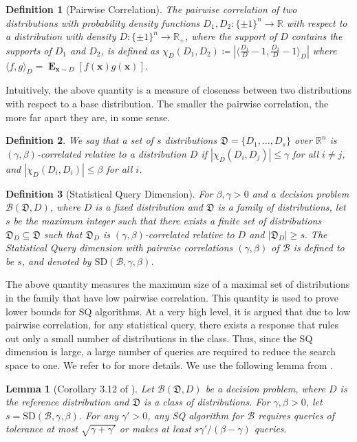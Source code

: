 \documentclass[10pt,a4paper]{article}
\newtheorem{lemma}{Lemma}[section]
\newtheorem{definition}{Definition}[section]
\newcommand{\eqdef}{\coloneqq}
\renewcommand\vec[1]{\mathbf{#1}}
\DeclareMathOperator*{\E}{\mathbf{E}}
\newcommand{\R}{\mathbb{R}}
\newcommand{\D}{D}
\newcommand{\1}{\Ind}
\newcommand{\x}{\vec x}
\begin{document}
\begin{definition}[Pairwise Correlation] \label{def:pc}
    The pairwise correlation of two distributions with probability density functions
    $\D_1, \D_2 : \{\pm 1\}^{n} \to \R$ with respect to a distribution with
    density $\D: \{\pm 1\}^n \to \R_+$, where the support of $\D$ contains
    the supports of $\D_1$ and $\D_2$, is defined as
    $\chi_{\D}(\D_1, \D_2) \eqdef |\langle \frac{D_1}{D}-1,\frac{D_2}{D}-1\rangle_D|$ where $\langle f,g\rangle_D=\E_{\x\sim D}[f(\x)g(\x)]$.
\end{definition}
Intuitively, the above quantity is a measure of closeness between two distributions with respect to a base distribution. The smaller the pairwise correlation, the more far apart they are, in some sense.
\begin{definition} \label{def:uncor}
    We say that a set of $s$ distributions $\mathfrak{D} = \{\D_1, \ldots , \D_s \}$
    over $\R^n$ is $(\gamma, \beta)$-correlated relative to a distribution $\D$
    if $|\chi_\D(\D_i, \D_j)| \leq \gamma$ for all $i \neq j$,
    and $|\chi_\D(\D_i, \D_i)| \leq \beta$ for all $i$.
\end{definition}

\begin{definition}[Statistical Query Dimension] \label{def:sq-dim}
    For $\beta, \gamma > 0$ and a decision problem $\mathcal{B}(\mathfrak D, \D)$,
    where $\D$ is a fixed distribution and $\mathfrak D$ is a family of distributions,
    let $s$ be the maximum integer such that there exists a finite set of distributions
    $\mathfrak{D}_\D \subseteq \mathfrak D$ such that
    $\mathfrak{D}_\D$ is $(\gamma, \beta)$-correlated relative to $\D$
    and $|\mathfrak{D}_\D| \geq s.$ The {\em Statistical Query dimension}
    with pairwise correlations $(\gamma, \beta)$ of $\mathcal{B}$ is defined to be $s$,
    and denoted by $\mathrm{SD}(\mathcal{B},\gamma,\beta)$.
\end{definition}
The above quantity measures the maximum size of a maximal set of distributions in the family that have low pairwise correlation. This quantity is used to prove lower bounds for SQ algorithms. At a very high level, it is argued that due to low pairwise correlation, for any statistical query, there exists a response that rules out only a small number of distributions in the class. Thus, since the SQ dimension is large, a large number of queries are required to reduce the search space to one. We refer to \cite{FeldmanGRVX17,reyzin2020statistical} for more details. We use the following lemma from \cite{FeldmanGRVX17}.
\begin{lemma}[Corollary 3.12 of \cite{FeldmanGRVX17}] \label{lem:sq-from-pairwise}
    Let $\mathcal{B}(\mathfrak D, \D)$ be a decision problem, where $\D$ is the reference distribution
    and $\mathfrak{D}$ is a class of distributions. For $\gamma, \beta >0$,
    let $s= \mathrm{SD}(\mathcal{B}, \gamma, \beta)$.
    For any $\gamma' > 0$, any SQ algorithm for $\mathcal{B}$ requires queries of tolerance at most $\sqrt{\gamma + \gamma'}$ or makes at least
    $s  \gamma' /(\beta - \gamma)$ queries.
\end{lemma}
\end{document}
